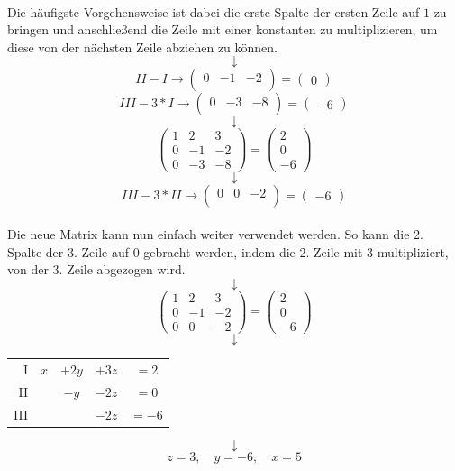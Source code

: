 \documentclass{school}
\begin{document}
\newpage~\\
Die häufigste Vorgehensweise ist dabei die erste Spalte der ersten Zeile auf $1$ zu bringen und anschließend die Zeile mit einer konstanten zu multiplizieren, um diese von der nächsten Zeile abziehen zu können.
$$\downarrow$$
$$II - I \to
\begin{pmatrix}
0 & -1 & -2 \\
\end{pmatrix} = \begin{pmatrix}0\end{pmatrix}
$$
$$III - 3 * I \to
\begin{pmatrix}
0 & -3 & -8 \\
\end{pmatrix} = \begin{pmatrix}-6\end{pmatrix}
$$
$$\downarrow$$
$$
\begin{pmatrix}
1 & 2 & 3 \\
0 & -1 & -2 \\
0 & -3 & -8
\end{pmatrix} =
\begin{pmatrix}
2 \\ 0 \\ -6
\end{pmatrix}
$$
$$\downarrow$$
$$III - 3 * II \to
\begin{pmatrix}
0 & 0 & -2 \\
\end{pmatrix} = \begin{pmatrix}-6\end{pmatrix}
$$
\vspace{1 em}~\\
Die neue Matrix kann nun einfach weiter verwendet werden. So kann die 2. Spalte der 3. Zeile auf $0$ gebracht werden, indem die 2. Zeile mit $3$ multipliziert, von der 3. Zeile abgezogen wird.
$$\downarrow$$
$$
\begin{pmatrix}
1 & 2 & 3 \\
0 & -1 & -2 \\
0 & 0 & -2
\end{pmatrix} =
\begin{pmatrix}
2 \\ 0 \\ -6
\end{pmatrix}
$$
$$\downarrow$$
\begin{center}
    \begin{tabular}{r c c c c}
        I & $x$ & $ +2y$ & $+3z$ & $= 2 $\\
        II & & $-y$ & $-2z$ & $= 0$\\
        III & & & $-2z$ & $= -6$
    \end{tabular}
\end{center}
$$\downarrow$$
$$z = 3,\quad y = -6,\quad x = 5$$
\end{document}
